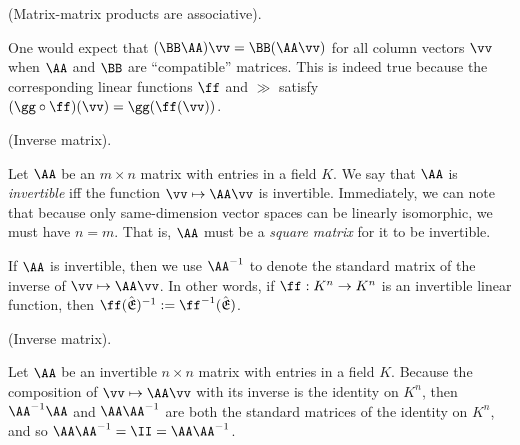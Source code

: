 \begin{remark}
    (Matrix-matrix products are associative).
    
    One would expect that $(\BB \AA) \vv = \BB (\AA \vv)$ for all column vectors $\vv$ when $\AA$ and $\BB$ are ``compatible'' matrices. This is indeed true because the corresponding linear functions $\ff$ and $\gg$ satisfy $(\gg \circ \ff)(\vv) = \gg(\ff(\vv))$.
\end{remark}

\begin{defn}
    (Inverse matrix).
    
    Let $\AA$ be an $m \times n$ matrix with entries in a field $K$. We say that $\AA$ is \textit{invertible} iff the function $\vv \mapsto \AA \vv$ is invertible. Immediately, we can note that because only same-dimension vector spaces can be linearly isomorphic, we must have $n = m$. That is, $\AA$ must be a \textit{square matrix} for it to be invertible.

    If $\AA$ is invertible, then we use $\AA^{-1}$ to denote the standard matrix of the inverse of $\vv \mapsto \AA \vv$. In other words, if $\ff:K^n \rightarrow K^n$ is an invertible linear function, then $\ff(\sE)^{-1} := \ff^{-1}(\sE)$.
\end{defn}

\begin{theorem}
    (Inverse matrix).

    Let $\AA$ be an invertible $n \times n$ matrix with entries in a field $K$.    Because the composition of $\vv \mapsto \AA \vv$ with its inverse is the identity on $K^n$, then $\AA^{-1} \AA$ and $\AA \AA^{-1}$ are both the standard matrices of the identity on $K^n$, and so $\AA \AA^{-1} = \II = \AA \AA^{-1}$. 
\end{theorem}


